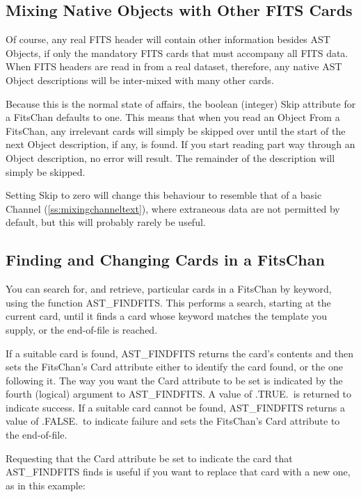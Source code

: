 \documentclass[twoside,11pt]{article}
\newcommand{\htmlref}[2]{#1}
\newcommand{\secref}[1]{\S\ref{#1}}
\renewcommand{\secref}[1]{\ref{#1}}
\begin{document}
\subsection{Mixing Native Objects with Other FITS Cards}

Of course, any real FITS header will contain other information besides
AST Objects, if only the mandatory FITS cards that must accompany all
FITS data. When FITS headers are read in from a real dataset,
therefore, any native AST \htmlref{Object}{Object} descriptions will be inter-mixed with
many other cards.

Because this is the normal state of affairs, the boolean (integer)
\htmlref{Skip}{Skip} attribute for a \htmlref{FitsChan}{FitsChan} defaults to one. This means that when
you read an Object From a FitsChan, any irrelevant cards will simply
be skipped over until the start of the next Object description, if
any, is found. If you start reading part way through an Object
description, no error will result. The remainder of the description
will simply be skipped.

Setting Skip to zero will change this behaviour to resemble that of a
basic \htmlref{Channel}{Channel} (\secref{ss:mixingchanneltext}), where extraneous data
are not permitted by default, but this will probably rarely be useful.

\subsection{\label{ss:findingandchangingfits}Finding and Changing Cards in a FitsChan}

You can search for, and retrieve, particular cards in a \htmlref{FitsChan}{FitsChan} by
keyword, using the function \htmlref{AST\_FINDFITS}{AST_FINDFITS}. This performs a search,
starting at the current card, until it finds a card whose keyword
matches the template you supply, or the end-of-file is reached.

If a suitable card is found, AST\_FINDFITS returns the card's contents
and then sets the FitsChan's \htmlref{Card}{Card} attribute either to identify the
card found, or the one following it. The way you want the Card
attribute to be set is indicated by the fourth (logical) argument to
AST\_FINDFITS. A value of .TRUE.\ is returned to indicate success.  If
a suitable card cannot be found, AST\_FINDFITS returns a value of
.FALSE.\ to indicate failure and sets the FitsChan's Card attribute to
the end-of-file.

Requesting that the Card attribute be set to indicate the card that
AST\_FINDFITS finds is useful if you want to replace that card with a
new one, as in this example:
\end{document}
